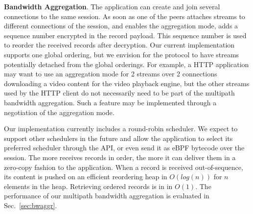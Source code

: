 \textbf{Bandwidth Aggregation}.
The application can create and join several \tcp connections to
the same \tcpls session. As soon as one of the peers attaches streams to
different \tcp connections of the session, and enables the aggregation mode,
\tcpls adds a sequence number encrypted in the \tls record payload. This
sequence number is used to reorder the received records after decryption. 
Our
current implementation supports one global ordering, but
we envision for the \tcpls protocol to have streams potentially detached from
the global orderings. For example, a HTTP application may want to use an
aggregation mode for 2 streams over 2 \tcp connections downloading a video
content for the video playback engine, but the other streams used by the HTTP
client do not necessarily need to be part of the multipath bandwidth aggregation.
Such a feature may be implemented through a negotiation of the aggregation
mode.

Our implementation currently includes a round-robin scheduler. We expect to
support other schedulers in the future and allow the application to select its 
preferred scheduler through the API, or even send it as eBPF bytecode over the 
session. The more \tcpls receives records in order, the more it can deliver 
them in a zero-copy fashion to the application. When a record is received 
out-of-sequence, its content is pushed on an efficient reordering heap in 
$O(log(n))$ for $n$ elements in the heap. Retrieving ordered records is in
in $O(1)$. The performance of our multipath bandwidth aggregation is evaluated 
in Sec.~\ref{sec:bwaggr}.


